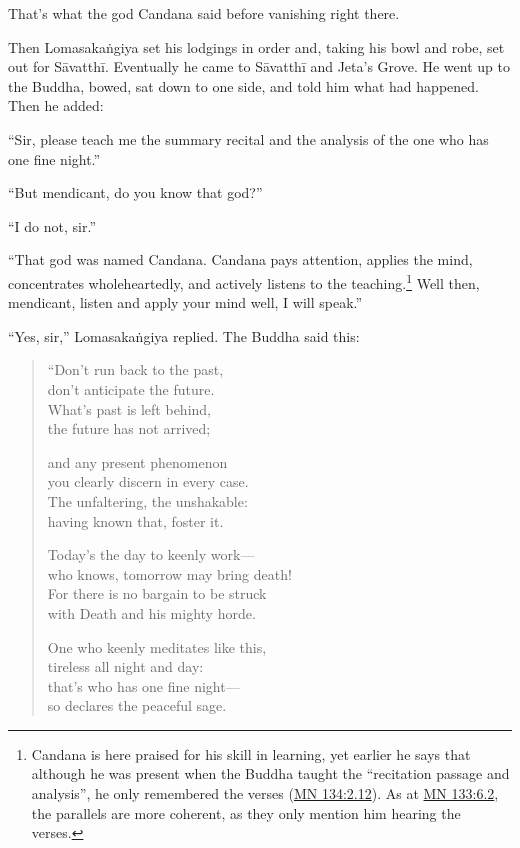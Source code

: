 \documentclass[12pt,openany]{book}%
\begin{document}
That’s what the god Candana said before vanishing right there. 

Then \textsanskrit{Lomasakaṅgiya} set his lodgings in order and, taking his bowl and robe, set out for \textsanskrit{Sāvatthī}. Eventually he came to \textsanskrit{Sāvatthī} and Jeta’s Grove. He went up to the Buddha, bowed, sat down to one side, and told him what had happened. Then he added: 

“Sir, please teach me the summary recital and the analysis of the one who has one fine night.” 

“But mendicant, do you know that god?” 

“I do not, sir.” 

“That god was named Candana. Candana pays attention, applies the mind, concentrates wholeheartedly, and actively listens to the teaching.\footnote{Candana is here praised for his skill in learning, yet earlier he says that although he was present when the Buddha taught the “recitation passage and analysis”, he only remembered the verses (\href{https://suttacentral.net/mn134/en/sujato\#2.12}{MN 134:2.12}). As at \href{https://suttacentral.net/mn133/en/sujato\#6.2}{MN 133:6.2}, the parallels are more coherent, as they only mention him hearing the verses. } Well then, mendicant, listen and apply your mind well, I will speak.” 

“Yes, sir,” \textsanskrit{Lomasakaṅgiya} replied. The Buddha said this: 

\begin{verse}%
“Don’t run back to the past, \\
don’t anticipate the future. \\
What’s past is left behind, \\
the future has not arrived; 

and any present phenomenon \\
you clearly discern in every case. \\
The unfaltering, the unshakable: \\
having known that, foster it. 

Today’s the day to keenly work—\\
who knows, tomorrow may bring death! \\
For there is no bargain to be struck \\
with Death and his mighty horde. 

One who keenly meditates like this, \\
tireless all night and day: \\
that’s who has one fine night—\\
so declares the peaceful sage. 

%
\end{verse}
\end{document}
